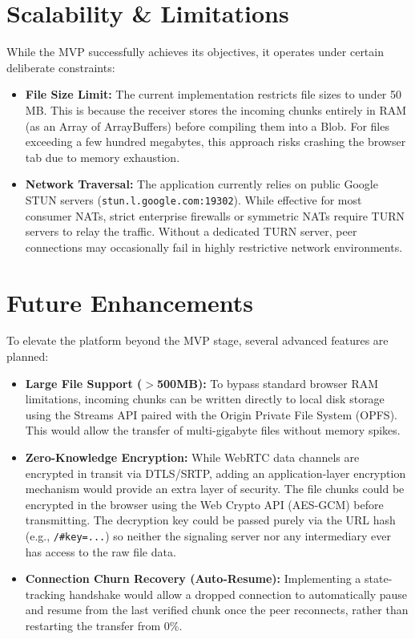 \documentclass[12pt, a4paper]{article}
\begin{document}
\section{Scalability \& Limitations}
While the MVP successfully achieves its objectives, it operates under certain deliberate constraints:
\begin{itemize}
    \item \textbf{File Size Limit:} The current implementation restricts file sizes to under 50 MB. This is because the receiver stores the incoming chunks entirely in RAM (as an Array of ArrayBuffers) before compiling them into a Blob. For files exceeding a few hundred megabytes, this approach risks crashing the browser tab due to memory exhaustion.
    \item \textbf{Network Traversal:} The application currently relies on public Google STUN servers (\texttt{stun.l.google.com:19302}). While effective for most consumer NATs, strict enterprise firewalls or symmetric NATs require TURN servers to relay the traffic. Without a dedicated TURN server, peer connections may occasionally fail in highly restrictive network environments.
\end{itemize}

\section{Future Enhancements}
To elevate the platform beyond the MVP stage, several advanced features are planned:
\begin{itemize}
    \item \textbf{Large File Support ($>$500MB):} To bypass standard browser RAM limitations, incoming chunks can be written directly to local disk storage using the Streams API paired with the Origin Private File System (OPFS). This would allow the transfer of multi-gigabyte files without memory spikes.
    \item \textbf{Zero-Knowledge Encryption:} While WebRTC data channels are encrypted in transit via DTLS/SRTP, adding an application-layer encryption mechanism would provide an extra layer of security. The file chunks could be encrypted in the browser using the Web Crypto API (AES-GCM) before transmitting. The decryption key could be passed purely via the URL hash (e.g., \texttt{/\#key=...}) so neither the signaling server nor any intermediary ever has access to the raw file data.
    \item \textbf{Connection Churn Recovery (Auto-Resume):} Implementing a state-tracking handshake would allow a dropped connection to automatically pause and resume from the last verified chunk once the peer reconnects, rather than restarting the transfer from 0\%.
\end{itemize}
\end{document}
